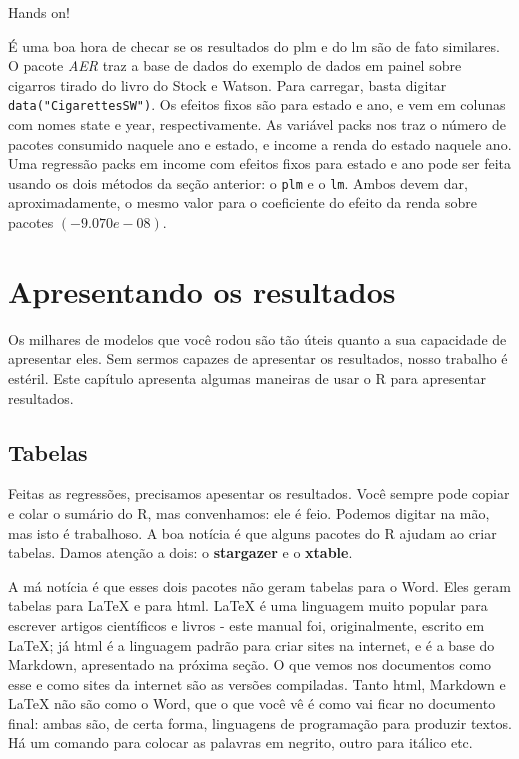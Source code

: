 \documentclass[]{book}
\begin{document}
Hands on!

É uma boa hora de checar se os resultados do plm e do lm são de fato
similares. O pacote \emph{AER} traz a base de dados do exemplo de dados
em painel sobre cigarros tirado do livro do Stock e Watson. Para
carregar, basta digitar \texttt{data("CigarettesSW")}. Os efeitos fixos
são para estado e ano, e vem em colunas com nomes state e year,
respectivamente. As variável packs nos traz o número de pacotes
consumido naquele ano e estado, e income a renda do estado naquele ano.
Uma regressão packs em income com efeitos fixos para estado e ano pode
ser feita usando os dois métodos da seção anterior: o \texttt{plm} e o
\texttt{lm}. Ambos devem dar, aproximadamente, o mesmo valor para o
coeficiente do efeito da renda sobre pacotes \((-9.070e-08)\).

\chapter{Apresentando os resultados}\label{apresentando-os-resultados}

Os milhares de modelos que você rodou são tão úteis quanto a sua
capacidade de apresentar eles. Sem sermos capazes de apresentar os
resultados, nosso trabalho é estéril. Este capítulo apresenta algumas
maneiras de usar o R para apresentar resultados.

\section{Tabelas}\label{tabelas}

Feitas as regressões, precisamos apesentar os resultados. Você sempre
pode copiar e colar o sumário do R, mas convenhamos: ele é feio. Podemos
digitar na mão, mas isto é trabalhoso. A boa notícia é que alguns
pacotes do R ajudam ao criar tabelas. Damos atenção a dois: o
\textbf{stargazer} e o \textbf{xtable}.

A má notícia é que esses dois pacotes não geram tabelas para o Word.
Eles geram tabelas para LaTeX e para html. LaTeX é uma linguagem muito
popular para escrever artigos científicos e livros - este manual foi,
originalmente, escrito em LaTeX; já html é a linguagem padrão para criar
sites na internet, e é a base do Markdown, apresentado na próxima seção.
O que vemos nos documentos como esse e como sites da internet são as
versões compiladas. Tanto html, Markdown e LaTeX não são como o Word,
que o que você vê é como vai ficar no documento final: ambas são, de
certa forma, linguagens de programação para produzir textos. Há um
comando para colocar as palavras em negrito, outro para itálico etc.
\end{document}
